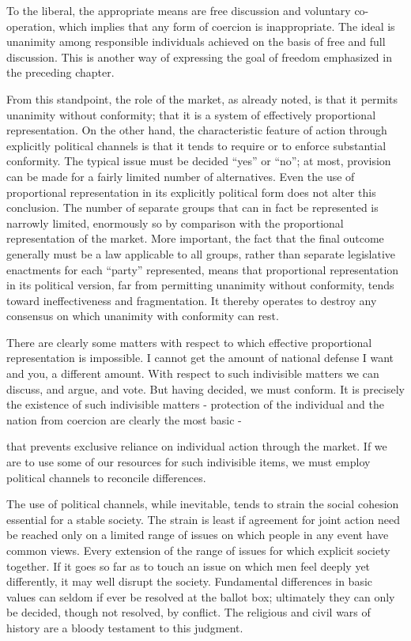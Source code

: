 \documentclass[11pt,openany]{book}
\begin{document}
To the liberal, the appropriate means are free discussion and voluntary co-operation, which implies that any form of coercion is inappropriate. The ideal is unanimity among responsible individuals achieved on the basis of free and full discussion. This is another way of expressing the goal of freedom emphasized in the preceding chapter.

From this standpoint, the role of the market, as already noted, is that it permits unanimity without conformity; that it is a system of effectively proportional representation. On the other hand, the characteristic feature of action through explicitly political channels is that it tends to require or to enforce substantial conformity. The typical issue must be decided ``yes'' or ``no''; at most, provision can be made for a fairly limited number of alternatives. Even the use of proportional representation in its explicitly political form does not alter this conclusion. The number of separate groups that can in fact be represented is narrowly limited, enormously so by comparison with the proportional representation of the market. More important, the fact that the final outcome generally must be a law applicable to all groups, rather than separate legislative enactments for each ``party'' represented, means that proportional representation in its political version, far from permitting unanimity without conformity, tends toward ineffectiveness and fragmentation. It thereby operates to destroy any consensus on which unanimity with conformity can rest.

There are clearly some matters with respect to which effective proportional representation is impossible. I cannot get the amount of national defense I want and you, a different amount. With respect to such indivisible matters we can discuss, and argue, and vote. But having decided, we must conform. It is precisely the existence of such indivisible matters - protection of the individual and the nation from coercion are clearly the most basic -

that prevents exclusive reliance on individual action through the market. If we are to use some of our resources for such indivisible items, we must employ political channels to reconcile differences.

The use of political channels, while inevitable, tends to strain the social cohesion essential for a stable society. The strain is least if agreement for joint action need be reached only on a limited range of issues on which people in any event have common views. Every extension of the range of issues for which explicit society together. If it goes so far as to touch an issue on which men feel deeply yet differently, it may well disrupt the society. Fundamental differences in basic values can seldom if ever be resolved at the ballot box; ultimately they can only be decided, though not resolved, by conflict. The religious and civil wars of history are a bloody testament to this judgment.
\end{document}
